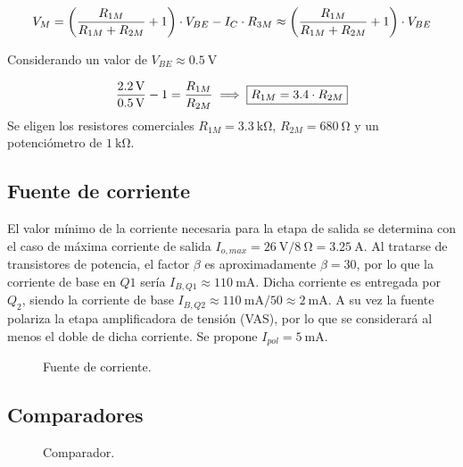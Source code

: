 	\begin{equation}
		\centering
		V_M = \left( \frac{R_{1M}}{R_{1M} + R_{2M}} +1 \right) \cdot V_{BE} - I_C \cdot R_{3M} \approx  \left( \frac{R_{1M}}{R_{1M} + R_{2M}} +1 \right) \cdot V_{BE}
	\end{equation}

	 Considerando un valor de $V_{BE} \approx \SI{0.5}{\volt}$

	 \begin{equation}
	 	\centering
		\frac{\SI{2.2}{\volt}}{\SI{0.5}{\volt}} -1 = \frac{R_{1M}}{R_{2M}} \implies \boxed{R_{1M} = \num{3,4} \cdot R_{2M}}
	\end{equation}
	Se eligen los resistores comerciales $R_{1M} = \SI{3.3}{\kilo\ohm}$, $R_{2M} = \SI{680}{\ohm}$ y un potenciómetro de $\SI{1}{\kilo\ohm}$. 

\subsection{Fuente de corriente}
	El valor mínimo de la corriente necesaria para la etapa de salida se determina con el caso de máxima corriente de salida $I_{o,max} = \SI{26}{\volt}/ \SI{8}{\ohm} = \SI{3.25}{\ampere}$. Al tratarse de transistores de potencia, el factor $\beta$ es aproximadamente $\beta = 30$, por lo que la corriente de base en $Q1$ sería $I_{B,Q1} \approx \SI{110}{\milli\ampere}$. Dicha corriente es entregada por $Q_2$, siendo la corriente de base $I_{B,Q2} \approx \SI{110}{\milli\ampere}/50 \approx \SI{2}{\milli\ampere}$. A su vez la fuente polariza la etapa amplificadora de tensión (VAS), por lo que se considerará al menos el doble de dicha corriente. Se propone $I_{pol} = \SI{5}{\milli\ampere}$.

	\begin{figure}[H]
		\centering
		\scalebox{0.5}{}
		\caption{Fuente de corriente.}
		\label{fig.fte}
	\end{figure}



\subsection{Comparadores}

	\begin{figure}[H]
		\centering
		\scalebox{0.5}{}
		\caption{Comparador.}
		\label{fig.comparador}
	\end{figure}

